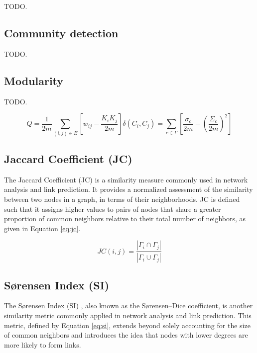 TODO.




\subsection{Community detection}

TODO.




\subsection{Modularity}

TODO.

\begin{equation}
\label{eq:modularity}
  Q
  = \frac{1}{2m} \sum_{(i, j) \in E} \left[w_{ij} - \frac{K_i K_j}{2m}\right] \delta(C_i, C_j)
  = \sum_{c \in \Gamma} \left[\frac{\sigma_c}{2m} - \left(\frac{\Sigma_c}{2m}\right)^2\right]
\end{equation}




\subsection{Jaccard Coefficient (JC)}

The Jaccard Coefficient (JC) \cite{jaccard1901etude} is a similarity measure commonly used in network analysis and link prediction. It provides a normalized assessment of the similarity between two nodes in a graph, in terms of their neighborhoods. JC is defined such that it assigns higher values to pairs of nodes that share a greater proportion of common neighbors relative to their total number of neighbors, as given in Equation \ref{eq:jc}.

\begin{equation}
\label{eq:jc}
  JC(i, j) = \frac{|\Gamma_i \cap \Gamma_j|}{|\Gamma_i \cup \Gamma_j|}
\end{equation}




\subsection{S{\o}rensen Index (SI)}

The S{\o}rensen Index (SI) \cite{sorensen1948method}, also known as the S{\o}rensen–Dice coefficient, is another similarity metric commonly applied in network analysis and link prediction. This metric, defined by Equation \ref{eq:si}, extends beyond solely accounting for the size of common neighbors and introduces the idea that nodes with lower degrees are more likely to form links.

